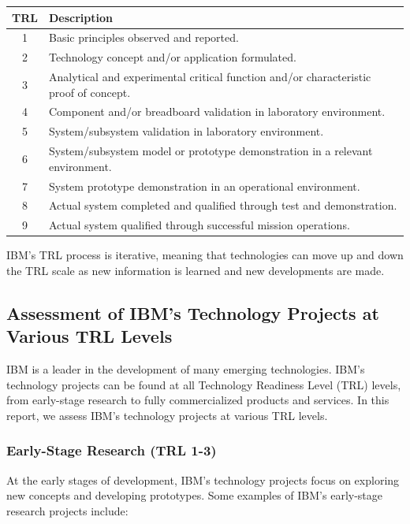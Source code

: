 \begin{table}[h]
\centering
\begin{tabular}{|c|p{10cm}|}
\hline
TRL & Description \\
\hline
1 & Basic principles observed and reported. \\
2 & Technology concept and/or application formulated. \\
3 & Analytical and experimental critical function and/or characteristic proof of concept. \\
4 & Component and/or breadboard validation in laboratory environment. \\
5 & System/subsystem validation in laboratory environment. \\
6 & System/subsystem model or prototype demonstration in a relevant environment. \\
7 & System prototype demonstration in an operational environment. \\
8 & Actual system completed and qualified through test and demonstration. \\
9 & Actual system qualified through successful mission operations. \\
\hline
\end{tabular}
\end{table}

IBM's TRL process is iterative, meaning that technologies can move up and down the TRL scale as new information is learned and new developments are made.

\subsection{Assessment of IBM's Technology Projects at Various TRL Levels}


IBM is a leader in the development of many emerging technologies. IBM's technology projects can be found at all Technology Readiness Level (TRL) levels, from early-stage research to fully commercialized products and services. In this report, we assess IBM's technology projects at various TRL levels.

\subsubsection{Early-Stage Research (TRL 1-3)}

At the early stages of development, IBM's technology projects focus on exploring new concepts and developing prototypes. Some examples of IBM's early-stage research projects include:

